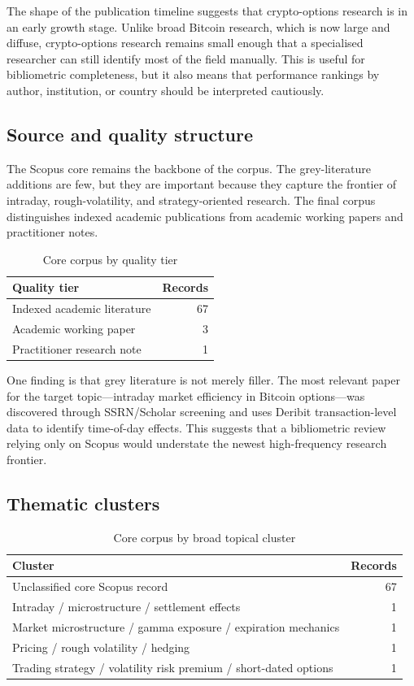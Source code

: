 \documentclass[11pt,a4paper]{article}
\begin{document}
The shape of the publication timeline suggests that crypto-options research is in an early growth stage. Unlike broad Bitcoin research, which is now large and diffuse, crypto-options research remains small enough that a specialised researcher can still identify most of the field manually. This is useful for bibliometric completeness, but it also means that performance rankings by author, institution, or country should be interpreted cautiously.

\subsection{Source and quality structure}

The Scopus core remains the backbone of the corpus. The grey-literature additions are few, but they are important because they capture the frontier of intraday, rough-volatility, and strategy-oriented research. The final corpus distinguishes indexed academic publications from academic working papers and practitioner notes.

\begin{table}[h!]
\centering
\caption{Core corpus by quality tier}
\begin{tabular}{lr}
\toprule
Quality tier & Records \\
\midrule
Indexed academic literature & 67 \\
Academic working paper & 3 \\
Practitioner research note & 1 \\
\bottomrule
\end{tabular}
\end{table}

One finding is that grey literature is not merely filler. The most relevant paper for the target topic---intraday market efficiency in Bitcoin options---was discovered through SSRN/Scholar screening and uses Deribit transaction-level data to identify time-of-day effects. This suggests that a bibliometric review relying only on Scopus would understate the newest high-frequency research frontier.

\subsection{Thematic clusters}

\begin{table}[h!]
\centering
\caption{Core corpus by broad topical cluster}
\begin{tabularx}{\textwidth}{Xr}
\toprule
Cluster & Records \\
\midrule
Unclassified core Scopus record & 67 \\
Intraday / microstructure / settlement effects & 1 \\
Market microstructure / gamma exposure / expiration mechanics & 1 \\
Pricing / rough volatility / hedging & 1 \\
Trading strategy / volatility risk premium / short-dated options & 1 \\
\bottomrule
\end{tabularx}
\end{table}
\end{document}
